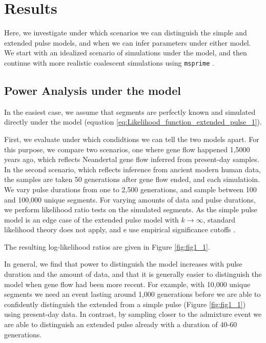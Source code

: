\documentclass[11pt]{article}
\begin{document}
\section{Results}\label{results}


Here, we investigate under which scenarios we can distinguish the simple and extended pulse models, and when we can infer parameters under either model. 
We start with an idealized scenario of simulations under the model, and then continue with more realistic coalescent simulations using \texttt{msprime} \citep{kelleher_efficient_2016}. 

\subsection{Power Analysis under the model}\label{Power Analysis}
In the easiest case, we assume that segments are perfectly known and simulated directly under the model (equation \ref{eq:Likelihood_function_extended_pulse_1}).

First, we evaluate under which condidtions we can tell the two models apart. For this purpose, we compare two scenarios, one where gene flow happened 1,5000 years ago, which reflects Neandertal gene flow inferred from present-day samples. In the second scenario, which reflects inference from ancient modern human data, the samples are taken 50 generations after gene flow ended, and each simulatioin.  We vary pulse durations from one to 2,500 generations, and sample between 100 and 100,000 unique segments. For varying amounts of data and pulse durations, we perform likelihood ratio tests on the simulated segments. As the simple pulse model is an edge case of the extended pulse model with $k\to \infty$, standard likelihood theory does not apply, and e use empirical significance cutoffs \cite{Kozubowski_Testing_2008}. 

The resulting log-likelihood ratios are given in Figure \ref{fig:fig1_1}.


In general, we find that power to distinguish the model increases with pulse duration and the amount of data, and that it is generally easier to distinguish the model when gene flow had been more recent.  For example, with 10,000 unique segments we need an event lasting around 1,000 generations before we are able to confidently distinguish the extended from a simple pulse (Figure \ref{fig:fig1_1}) using present-day data. In contrast, by sampling closer to the admixture event we are able to distinguish an extended pulse already with a duration of 40-60 generations.
\end{document}
